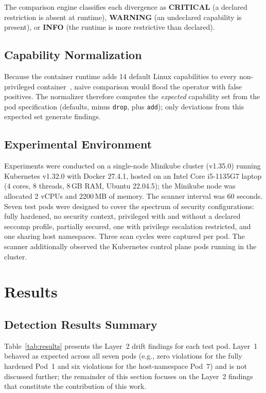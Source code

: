 \documentclass[conference]{IEEEtran}
\begin{document}
The comparison engine classifies each divergence as \textbf{CRITICAL} (a declared restriction is absent at runtime), \textbf{WARNING} (an undeclared capability is present), or \textbf{INFO} (the runtime is more restrictive than declared).

\subsection{Capability Normalization}

Because the container runtime adds 14 default Linux capabilities to every non-privileged container~\cite{dockerseccomp2024}, naive comparison would flood the operator with false positives. The normalizer therefore computes the \emph{expected} capability set from the pod specification (defaults, minus \texttt{drop}, plus \texttt{add}); only deviations from this expected set generate findings.

\subsection{Experimental Environment}

Experiments were conducted on a single-node Minikube cluster (v1.35.0) running Kubernetes v1.32.0 with Docker 27.4.1, hosted on an Intel Core i5-1135G7 laptop (4 cores, 8 threads, 8\,GB RAM, Ubuntu 22.04.5); the Minikube node was allocated 2 vCPUs and 2200\,MB of memory. The scanner interval was 60 seconds. Seven test pods were designed to cover the spectrum of security configurations: fully hardened, no security context, privileged with and without a declared seccomp profile, partially secured, one with privilege escalation restricted, and one sharing host namespaces. Three scan cycles were captured per pod. The scanner additionally observed the Kubernetes control plane pods running in the cluster.

\section{Results}

\subsection{Detection Results Summary}

Table~\ref{tab:results} presents the Layer~2 drift findings for each test pod. Layer~1 behaved as expected across all seven pods (e.g., zero violations for the fully hardened Pod~1 and six violations for the host-namespace Pod~7) and is not discussed further; the remainder of this section focuses on the Layer~2 findings that constitute the contribution of this work.
\end{document}
